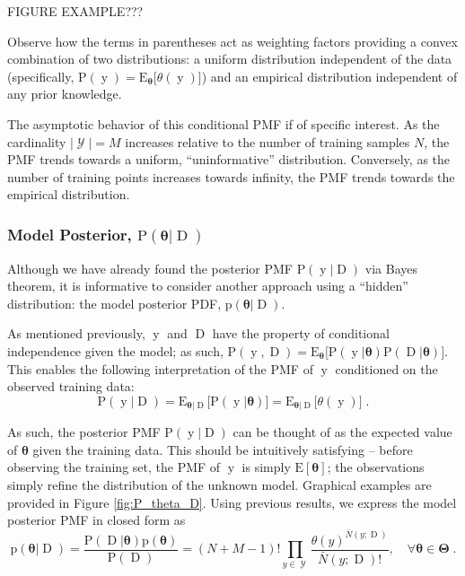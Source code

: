 \documentclass[12pt]{report}
\DeclareMathOperator{\yrm}{\mathrm{y}}
\DeclareMathOperator{\Drm}{\mathrm{D}}
\DeclareMathOperator{\Ycal}{\mathcal{Y}}
\begin{document}
FIGURE EXAMPLE???

Observe how the terms in parentheses act as weighting factors providing a convex combination of two distributions: a uniform distribution independent of the data (specifically, $\text{P}(\yrm) = \text{E}_{\bm{\theta}}\big[ \theta(\yrm) \big]$) and an empirical distribution independent of any prior knowledge.

The asymptotic behavior of this conditional PMF if of specific interest. As the cardinality $|\Ycal| = M$ increases relative to the number of training samples $N$, the PMF trends towards a uniform, ``uninformative'' distribution. Conversely, as the number of training points increases towards infinity, the PMF trends towards the empirical distribution. 






\subsubsection{Model Posterior, $\text{P}(\bm{\theta} | \Drm)$}

Although we have already found the posterior PMF $\text{P}(\yrm | \Drm)$ via Bayes theorem, it is informative to consider another approach using a ``hidden'' distribution: the model posterior PDF, $\text{p}(\bm{\theta} | \Drm)$. 

As mentioned previously, $\yrm$ and $\Drm$ have the property of conditional independence given the model; as such, $\text{P}(\yrm,\Drm) = \text{E}_{\bm{\theta}} \big[ \text{P}(\yrm | \bm{\theta}) \text{P}(\Drm | \bm{\theta}) \big]$. This enables the following interpretation of the PMF of $\yrm$ conditioned on the observed training data:
\begin{equation}
\text{P}(\yrm | \Drm) = \text{E}_{\bm{\theta} | \Drm} \big[ \text{P}(\yrm | \bm{\theta}) \big] = \text{E}_{\bm{\theta} | \Drm}\big[ \theta(\yrm) \big] \;.
\end{equation}

As such, the posterior PMF $\text{P}(\yrm | \Drm)$ can be thought of as the expected value of $\bm{\theta}$ given the training data. This should be intuitively satisfying -- before observing the training set, the PMF of $\yrm$ is simply $\text{E}[\bm{\theta}]$; the observations simply refine the distribution of the unknown model. Graphical examples are provided in Figure \ref{fig:P_theta_D}. Using previous results, we express the model posterior PMF in closed form as
\begin{equation} \label{P_t_D}
\text{p}(\bm{\theta} | \Drm) = \frac{\text{P}(\Drm | \bm{\theta}) \text{p}(\bm{\theta})}{\text{P}(\Drm)}
= (N+M-1)! \prod_{y \in \Ycal} \frac{\theta(y)^{\bar{N}(y;\Drm)}}{\bar{N}(y;\Drm)!} ,  \quad  \forall \bm{\theta} \in \bm{\Theta} \;.
\end{equation}
\end{document}
